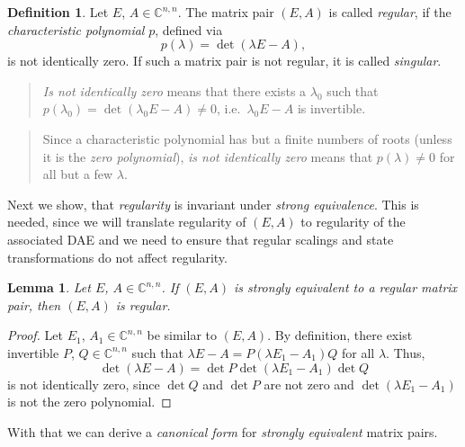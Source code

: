 \documentclass[]{book}
\newenvironment {JHSAYS} [0] {\begin{quote}\color{jhsc}} {\end{quote}}
\newtheorem{lemma}{Lemma}[chapter]
\theoremstyle{definition}
\newtheorem{definition}{Definition}[chapter]
\theoremstyle{definition}
\theoremstyle{definition}
\theoremstyle{definition}
\theoremstyle{remark}
\begin{document}
\begin{definition}
\protect\hypertarget{def:regularity}{}{\label{def:regularity} }Let \(E\), \(A \in \mathbb C^{n,n}\). The matrix pair \((E, A)\) is called \emph{regular}, if the \emph{characteristic polynomial} \(p\), defined via
\[
p(\lambda) = \det (\lambda E- A),
\]
is not identically zero. If such a matrix pair is not regular, it is called \emph{singular}.
\end{definition}

\begin{JHSAYS}
\emph{Is not identically zero} means that there exists a \(\lambda_0\)
such that \(p(\lambda_0)=\det (\lambda_0 E - A) \neq 0\),
i.e.~\(\lambda_0 E - A\) is invertible.
\end{JHSAYS}

\begin{JHSAYS}
Since a characteristic polynomial has but a finite numbers of roots
(unless it is the \emph{zero polynomial}), \emph{is not identically
zero} means that \(p(\lambda) \neq 0\) for all but a few \(\lambda\).
\end{JHSAYS}

Next we show, that \emph{regularity} is invariant under \emph{strong equivalence}. This is needed, since we will translate regularity of \((E,A)\) to regularity of the associated DAE and we need to ensure that regular scalings and state transformations do not affect regularity.

\begin{lemma}
\protect\hypertarget{lem:invariance-regularity}{}{\label{lem:invariance-regularity} }Let \(E\), \(A \in \mathbb C^{n,n}\). If \((E, A)\) is strongly equivalent to a regular matrix pair, then \((E, A)\) is regular.
\end{lemma}

\begin{proof}
{}Let \(E_1\), \(A_1 \in \mathbb C^{n, n}\) be similar to \((E, A)\). By definition, there exist invertible \(P\), \(Q\in \mathbb C^{n,n}\) such that \(\lambda E - A = P(\lambda E_1 -A_1)Q\) for all \(\lambda\). Thus,
\[
\det (\lambda E - A) = \det P \det (\lambda E_1 - A_1) \det Q
\]
is not identically zero, since \(\det Q\) and \(\det P\) are not zero and \(\det (\lambda E_1 - A_1)\) is not the zero polynomial.
\end{proof}

With that we can derive a \emph{canonical form} for \emph{strongly equivalent} matrix pairs.
\end{document}

